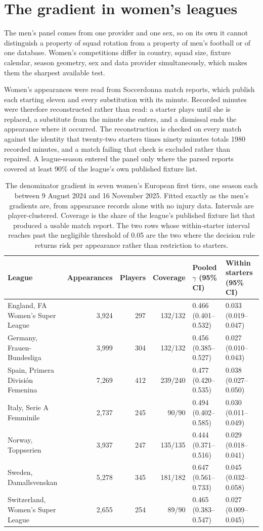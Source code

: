 \documentclass[11pt]{article}
\begin{document}
\section{The gradient in women's leagues}

The men's panel comes from one provider and one sex, so on its own it cannot distinguish a property of squad rotation from a property of men's football or of one database. Women's competitions differ in country, squad size, fixture calendar, season geometry, sex and data provider simultaneously, which makes them the sharpest available test.

Women's appearances were read from Soccerdonna match reports, which publish each starting eleven and every substitution with its minute. Recorded minutes were therefore reconstructed rather than read: a starter plays until she is replaced, a substitute from the minute she enters, and a dismissal ends the appearance where it occurred. The reconstruction is checked on every match against the identity that twenty-two starters times ninety minutes totals 1980 recorded minutes, and a match failing that check is excluded rather than repaired. A league-season entered the panel only where the parsed reports covered at least 90\% of the league's own published fixture list.

\begin{table}[h]
\centering
\caption{The denominator gradient in seven women's European first tiers, one season each between 9 August 2024 and 16 November 2025. Fitted exactly as the men's gradients are, from appearance records alone with no injury data. Intervals are player-clustered. Coverage is the share of the league's published fixture list that produced a usable match report. The two rows whose within-starter interval reaches past the negligible threshold of 0.05 are the two where the decision rule returns risk per appearance rather than restriction to starters.}
\label{tab:supp_leagues_women}
\footnotesize
\setlength{\tabcolsep}{3pt}
\begin{tabular}{lrrrll}
\toprule
League & Appearances & Players & Coverage & Pooled $\gamma$ (95\% CI) & Within starters (95\% CI)\\
\midrule
England, FA Women's Super League & 3,924 & 297 & 132/132 & 0.466 (0.401--0.532) & 0.033 (0.019--0.047)\\
Germany, Frauen-Bundesliga & 3,999 & 304 & 132/132 & 0.456 (0.385--0.527) & 0.027 (0.010--0.043)\\
Spain, Primera División Femenina & 7,269 & 412 & 239/240 & 0.477 (0.420--0.535) & 0.038 (0.027--0.050)\\
Italy, Serie A Femminile & 2,737 & 245 & 90/90 & 0.494 (0.402--0.585) & 0.030 (0.011--0.049)\\
Norway, Toppserien & 3,937 & 247 & 135/135 & 0.444 (0.371--0.516) & 0.029 (0.018--0.041)\\
Sweden, Damallsvenskan & 5,278 & 345 & 181/182 & 0.647 (0.561--0.733) & 0.045 (0.032--0.058)\\
Switzerland, Women's Super League & 2,655 & 254 & 89/90 & 0.465 (0.383--0.547) & 0.027 (0.009--0.045)\\
\bottomrule
\end{tabular}
\end{table}
\end{document}
